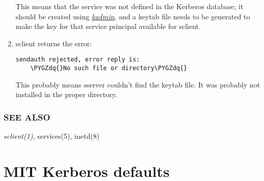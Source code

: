 \documentclass[letterpaper,10pt,english]{sphinxmanual}
\def\PYGZdq{\char`\"}
\begin{document}
\begin{enumerate}
This means that the  service was not
defined in the Kerberos database; it should be created using
{\hyperref[admin/admin_commands/kadmin_local:kadmin-1]{\emph{kadmin}}}, and a keytab file needs to be generated to make
the key for that service principal available for sclient.

\item {} 
sclient returns the error:

\begin{Verbatim}[commandchars=\\\{\}]
sendauth rejected, error reply is:
    \PYGZdq{}No such file or directory\PYGZdq{}
\end{Verbatim}

This probably means sserver couldn't find the keytab file.  It was
probably not installed in the proper directory.

\end{enumerate}


\subsection{SEE ALSO}
\label{admin/admin_commands/sserver:see-also}
\emph{sclient(1)}, services(5), inetd(8)


\chapter{MIT Kerberos defaults}
\label{mitK5defaults:mitk5defaults}\label{mitK5defaults::doc}\label{mitK5defaults:mit-kerberos-defaults}
\end{document}
